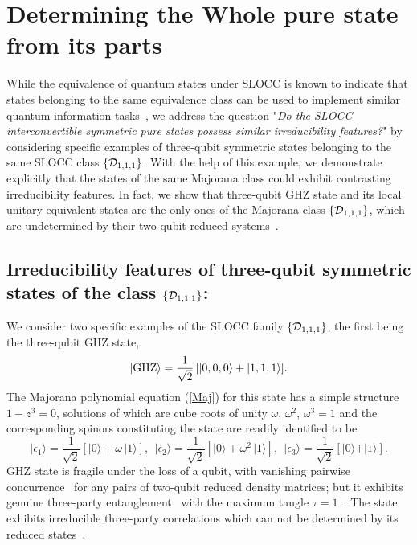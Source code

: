 \documentclass[pra,preprint,a4paper,superscriptaddress]{revtex4}
\newcommand{\be}{\begin{equation}}
\newcommand{\ee}{\end{equation}}
\begin{document}
{\section{Determining the Whole pure state from its parts} 

While the equivalence of quantum states under SLOCC is known to indicate that states belonging to the same equivalence class can be used to implement 
similar quantum information tasks~\cite{Dur}, we address the question    
"{\emph{Do the {\rm SLOCC} interconvertible symmetric pure states possess similar irreducibility features?}}" by considering specific examples of three-qubit symmetric states belonging to the same SLOCC class 
$\{{\cal D}_{1,1,1}\}$.  With the help of this example, we demonstrate explicitly that the states of the same Majorana class could exhibit contrasting irreducibility features. In fact, we show that three-qubit GHZ state and its local unitary equivalent states are the only ones of the Majorana class $\{{\cal D}_{1,1,1}\}$,  which are undetermined by their two-qubit reduced systems~\cite{SP1,Walck,Walck2}. 


\subsection{Irreducibility features of three-qubit symmetric states of the class $\{{\cal D}_{1,1,1} \}$:}


We consider two specific examples of the SLOCC family $\{{\cal D}_{1,1,1}\}$,  the first being the three-qubit 
GHZ state,  
\begin{equation}
\label{GHZ}
\vert {\rm GHZ}\rangle= \frac{1}{\sqrt{2}}\, [\vert 0,0,0\rangle +  \vert 1,1,1\rangle]. 
\end{equation}      
The Majorana polynomial equation (\ref{Maj}) for this state has a simple structure $1-z^3=0$, solutions of 
which are cube roots of unity $\omega$, $\omega^2$, $\omega^3=1$ and the corresponding spinors constituting the state are readily identified to be 
\be
\vert \epsilon_1\rangle =\frac{1}{\sqrt{2}}[\vert 0\rangle+\omega\, \vert 1\rangle],\ \  \vert \epsilon_2\rangle =\frac{1}{\sqrt{2}}[\vert 0\rangle+\omega^2\, \vert 1\rangle], \ \ \vert \epsilon_3\rangle =\frac{1}{\sqrt{2}}[\vert 0\rangle+ \vert 1\rangle].
\ee 
GHZ state is fragile under the loss of a qubit, with vanishing pairwise concurrence~\cite{Wot,Wot2} for any pairs of 
two-qubit reduced density matrices; but it exhibits genuine three-party entanglement~\cite{Dur,RaRe} with the 
maximum tangle  $\tau=1$~\cite{Kun}.  The state exhibits irreducible three-party correlations which can not be  
determined by its reduced states~\cite{SP1,Walck,Walck2}. 

}
\end{document}
